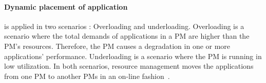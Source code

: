 


\paragraph{Dynamic placement of application} is applied in two scenarios \cite{Mishra:2012kx}: Overloading and underloading. Overloading is a scenario where the total demands of applications in a PM are higher than the PM's resources. Therefore, the PM causes a degradation in one or more applications' performance. Underloading is a scenario where the PM is running in low utilization. In both scenarios, resource management moves the applications from one PM to another PMs in an on-line fashion~\cite{Borodin:2cY4439E}.





